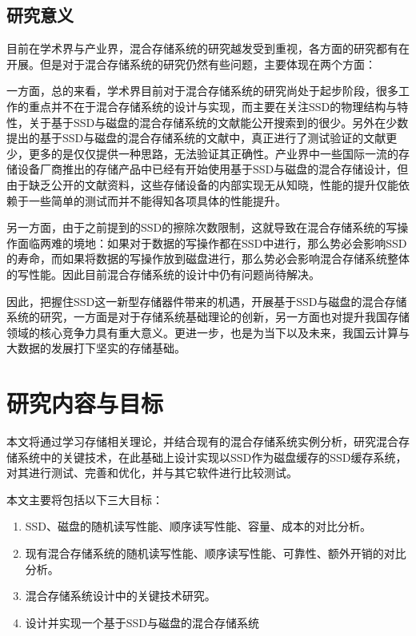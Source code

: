 \subsection{研究意义}

目前在学术界与产业界，混合存储系统的研究越发受到重视，各方面的研究都有在开展。但是对于混合存储系统的研究仍然有些问题，主要体现在两个方面：

一方面，总的来看，学术界目前对于混合存储系统的研究尚处于起步阶段，很多工作的重点并不在于混合存储系统的设计与实现，而主要在关注SSD的物理结构与特性，关于基于SSD与磁盘的混合存储系统的文献\cite{guerra2011cost, kim2011hybridstore}能公开搜索到的很少。另外在少数提出的基于SSD与磁盘的混合存储系统的文献中，真正进行了测试验证的文献更少，更多的是仅仅提供一种思路，无法验证其正确性。产业界中一些国际一流的存储设备厂商推出的存储产品中已经有开始使用基于SSD与磁盘的混合存储设计，但由于缺乏公开的文献资料，这些存储设备的内部实现无从知晓，性能的提升仅能依赖于一些简单的测试而并不能得知各项具体的性能提升。

另一方面，由于之前提到的SSD的擦除次数限制，这就导致在混合存储系统的写操作面临两难的境地：如果对于数据的写操作都在SSD中进行，那么势必会影响SSD的寿命，而如果将数据的写操作放到磁盘进行，那么势必会影响混合存储系统整体的写性能。因此目前混合存储系统的设计中仍有问题尚待解决。

因此，把握住SSD这一新型存储器件带来的机遇，开展基于SSD与磁盘的混合存储系统的研究，一方面是对于存储系统基础理论的创新，另一方面也对提升我国存储领域的核心竞争力具有重大意义。更进一步，也是为当下以及未来，我国云计算与大数据的发展打下坚实的存储基础。

\section{研究内容与目标}

本文将通过学习存储相关理论，并结合现有的混合存储系统实例分析，研究混合存储系统中的关键技术，在此基础上设计实现以SSD作为磁盘缓存的SSD缓存系统，对其进行测试、完善和优化，并与其它软件进行比较测试。

本文主要将包括以下三大目标：
\begin{enumerate}
    \item SSD、磁盘的随机读写性能、顺序读写性能、容量、成本的对比分析。
    \item 现有混合存储系统的随机读写性能、顺序读写性能、可靠性、额外开销的对比分析。
    \item 混合存储系统设计中的关键技术研究。
    \item 设计并实现一个基于SSD与磁盘的混合存储系统
\end{enumerate}

